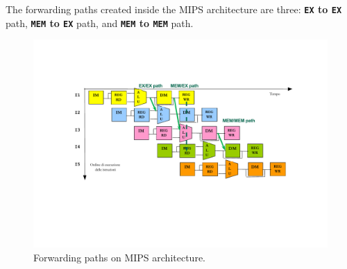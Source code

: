 \noindent
The forwarding paths created inside the MIPS architecture are three: \textbf{\texttt{EX} to \texttt{EX}} path, \textbf{\texttt{MEM} to \texttt{EX}} path, and \textbf{\texttt{MEM} to \texttt{MEM}} path.
\begin{figure}[!htp]
    \centering
    \includegraphics[width=\textwidth]{img/forwarding-paths-1.pdf}
    \caption{Forwarding paths on MIPS architecture.\cite{pipelining-slides}}
\end{figure}

